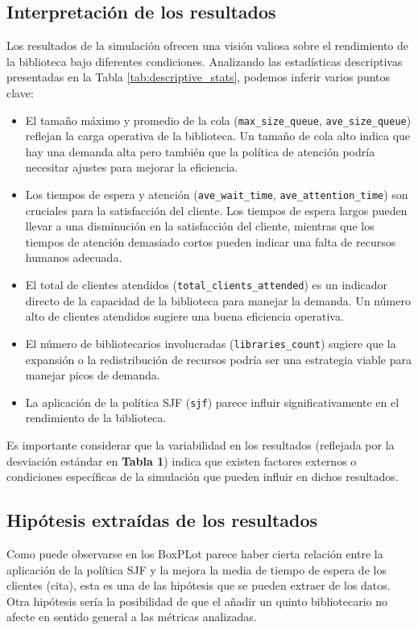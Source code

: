 \documentclass[10pt,twocolumn]{article}
\begin{document}
{\color{gray}
\subsection{Interpretación de los resultados}
Los resultados de la simulación ofrecen una visión valiosa sobre el rendimiento de la biblioteca bajo diferentes condiciones. Analizando las estadísticas descriptivas presentadas en la Tabla \ref{tab:descriptive_stats}, podemos inferir varios puntos clave:

\begin{itemize}
	\item El tamaño máximo y promedio de la cola (\texttt{max\_size\_queue}, \texttt{ave\_size\_queue}) reflejan la carga operativa de la biblioteca. Un tamaño de cola alto indica que hay una demanda alta pero también que la política de atención podría necesitar ajustes para mejorar la eficiencia.
	\item Los tiempos de espera y atención (\texttt{ave\_wait\_time}, \texttt{ave\_attention\_time}) son cruciales para la satisfacción del cliente. Los tiempos de espera largos pueden llevar a una disminución en la satisfacción del cliente, mientras que los tiempos de atención demasiado cortos pueden indicar una falta de recursos humanos adecuada.
	\item El total de clientes atendidos (\texttt{total\_clients\_attended}) es un indicador directo de la capacidad de la biblioteca para manejar la demanda. Un número alto de clientes atendidos sugiere una buena eficiencia operativa.
	\item El número de bibliotecarios involucradas (\texttt{libraries\_count}) sugiere que la expansión o la redistribución de recursos podría ser una estrategia viable para manejar picos de demanda.
	\item La aplicación de la política SJF (\texttt{sjf}) parece influir significativamente en el rendimiento de la biblioteca.
\end{itemize}

Es importante considerar que la variabilidad en los resultados (reflejada por la desviación estándar en \textbf{Tabla 1}) indica que existen factores externos o condiciones específicas de la simulación que pueden influir en dichos resultados.

\subsection{Hipótesis extraídas de los resultados}
Como puede observarse en los BoxPLot parece haber cierta relación entre la aplicación de la política SJF y la mejora la media de tiempo de espera de los clientes (cita), esta es una de las hipótesis que se pueden extraer de los datos.
Otra hipótesis sería la posibilidad de que el añadir un quinto bibliotecario no afecte en sentido general a las métricas analizadas.

}
\end{document}
